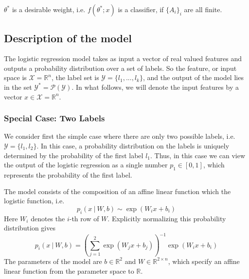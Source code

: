 \begin{remark}
$\theta^*$ is a desirable weight, i.e. $f(\theta^*;x)$ is a classifier, if $\{A_i\}_i$ are all finite. 
\end{remark}


\subsection{Description of the model}
The logistic regression model takes as input a vector of real valued features
and outputs a probability distribution over a set of labels. So the feature, or input space is
$\mathcal{X} = \mathbb{R}^n$, the label set is $\mathcal{Y} = \{l_1,...,l_k\}$, and the output of the model
lies in the set $\mathcal{Y}^* = \mathcal{P}(\mathcal{Y})$. In what follows, we will denote the 
input features by a vector $x\in \mathcal{X} = \mathbb{R}^n$.

\subsubsection{Special Case: Two Labels}
We consider first the simple case where there are only two possible labels, i.e. $\mathcal{Y} = \{l_1,l_2\}$.
In this case, a probability distribution on the labels is uniquely determined by the probability of the first label
$l_1$. Thus, in this case we can view the output of the logistic regression as a single number $p_1\in [0,1]$, which
represents the probability of the first label.

The model consists of the composition of an affine linear function which the logistic function, i.e.
\begin{equation}
 p_i(x~|~W,b) \sim \exp(W_{i}x + b_i)
\end{equation}
Here
$W_{i}$ denotes the $i$-th row of $W$. Explicitly normalizing this probability distribution gives
$$p_i(x~|~W,b) = \left(\displaystyle\sum_{j = 1}^2\exp(W_{j}x + b_j)\right)^{-1}\exp(W_{i}x + b_i)$$
The parameters of the model are $b\in \mathbb{R}^2$
and $W\in \mathbb{R}^{2\times n}$, which specify an affine linear function from the parameter space to $\mathbb{R}$.

